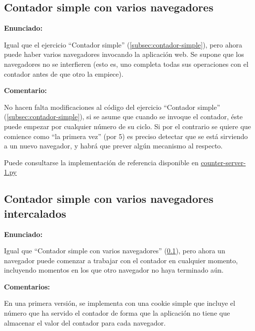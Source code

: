 \subsection{Contador simple con varios navegadores}
\label{subsec:contador-simple-varios}

\textbf{Enunciado:}

Igual que el ejercicio ``Contador simple'' (\ref{subsec:contador-simple}), pero ahora puede haber varios navegadores invocando la aplicación web. Se supone que los navegadores no se interfieren (esto es, uno completa todas sus operaciones con el contador antes de que otro la empiece).

\textbf{Comentario:}

No hacen falta modificaciones al código del ejercicio ``Contador simple'' (\ref{subsec:contador-simple}), si se asume que cuando se invoque el contador, éste puede empezar por cualquier número de su ciclo. Si por el contrario se quiere que comience como ``la primera vez'' (por 5) es preciso detectar que se está sirviendo a un nuevo navegador, y habrá que prever algún mecanismo al respecto.

Puede consultarse la implementación de referencia disponible en
\href{https://github.com/CursosWeb/Code/blob/master/Python-Web/counter/counter-server-1.py}{counter-server-1.py}

\subsection{Contador simple con varios navegadores intercalados}
\label{subsec:contador-simple-varios-intercalados}

\textbf{Enunciado:}

Igual que ``Contador simple con varios navegadores'' (\ref{subsec:contador-simple-varios}), pero ahora un navegador puede comenzar a trabajar con el contador en cualquier momento, incluyendo momentos en los que otro navegador no haya terminado aún.

\textbf{Comentarios:}

En una primera versión, se implementa con una cookie simple que incluye el número que ha servido el contador de forma que la aplicación no tiene que almacenar el valor del contador para cada navegador.

